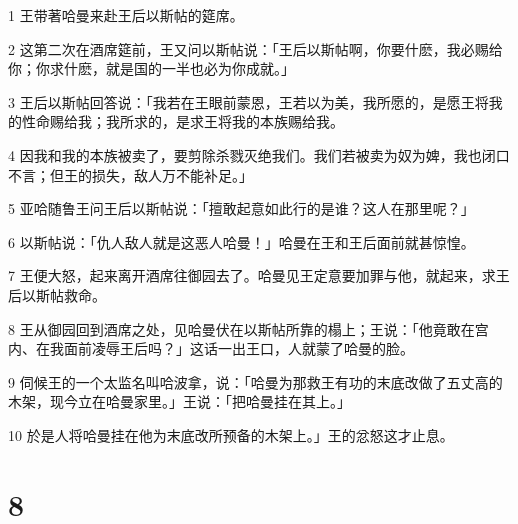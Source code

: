 \par 1 王带著哈曼来赴王后以斯帖的筵席。
\par 2 这第二次在酒席筵前，王又问以斯帖说：「王后以斯帖啊，你要什麽，我必赐给你；你求什麽，就是国的一半也必为你成就。」
\par 3 王后以斯帖回答说：「我若在王眼前蒙恩，王若以为美，我所愿的，是愿王将我的性命赐给我；我所求的，是求王将我的本族赐给我。
\par 4 因我和我的本族被卖了，要剪除杀戮灭绝我们。我们若被卖为奴为婢，我也闭口不言；但王的损失，敌人万不能补足。」
\par 5 亚哈随鲁王问王后以斯帖说：「擅敢起意如此行的是谁？这人在那里呢？」
\par 6 以斯帖说：「仇人敌人就是这恶人哈曼！」哈曼在王和王后面前就甚惊惶。
\par 7 王便大怒，起来离开酒席往御园去了。哈曼见王定意要加罪与他，就起来，求王后以斯帖救命。
\par 8 王从御园回到酒席之处，见哈曼伏在以斯帖所靠的榻上；王说：「他竟敢在宫内、在我面前凌辱王后吗？」这话一出王口，人就蒙了哈曼的脸。
\par 9 伺候王的一个太监名叫哈波拿，说：「哈曼为那救王有功的末底改做了五丈高的木架，现今立在哈曼家里。」王说：「把哈曼挂在其上。」
\par 10 於是人将哈曼挂在他为末底改所预备的木架上。」王的忿怒这才止息。

\chapter{8}

